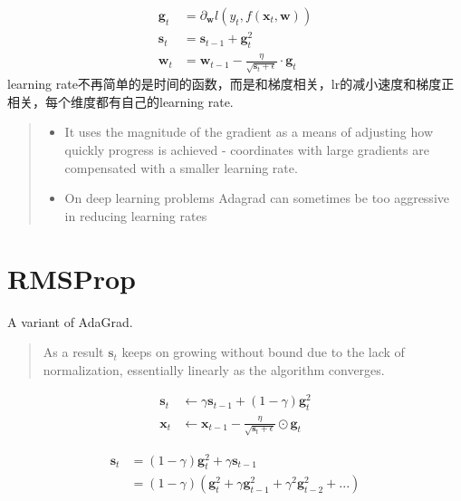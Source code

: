 \begin{equation}
    \begin{split}
        \mathbf{g}_t &= \partial _{\mathbf{w}} l(y_t, f(\mathbf{x}_t, \mathbf{w}))\\
        \mathbf{s}_t &= \mathbf{s}_{t-1} + \mathbf{g}_t^2 \\
        \mathbf{w}_t &= \mathbf{w}_{t-1} - \frac{\eta}{\sqrt{\mathbf{s}_t + \epsilon}} \cdot \mathbf{g}_t
    \end{split}
\end{equation}
learning rate不再简单的是时间的函数，而是和梯度相关，lr的减小速度和梯度正相关，每个维度都有自己的learning rate.
\begin{quote}
    \begin{itemize}
        \item It uses the magnitude of the gradient as a means of adjusting how quickly progress is achieved - coordinates with large gradients are compensated with a smaller learning rate.
        \item On deep learning problems Adagrad can sometimes be too aggressive in reducing learning rates
    \end{itemize}
\end{quote}


\section{RMSProp}
A variant of AdaGrad.

\begin{quotation}
    As a result $\mathbf{s}_t$ keeps on growing without bound due to the lack of normalization, essentially linearly
    as the algorithm converges.
\end{quotation}
\begin{equation}
    \begin{split}
        \mathbf{s}_t &\leftarrow \gamma\mathbf{s}_{t-1} + (1-\gamma)\mathbf{g}^2_{t} \\
        \mathbf{x}_t &\leftarrow \mathbf{x}_{t-1} - \frac{\eta}{\sqrt{\mathbf{s}_t + \epsilon}} \odot \mathbf{g}_t
    \end{split}
\end{equation}

\begin{equation}
    \begin{split}
        \mathbf{s}_t &= (1-\gamma) \mathbf{g}^2_t + \gamma\mathbf{s}_{t-1} \\
        &= (1-\gamma)(\mathbf{g}^2_t + \gamma\mathbf{g}^2_{t-1} + \gamma^2\mathbf{g}^2_{t-2}+...)
    \end{split}
\end{equation}

